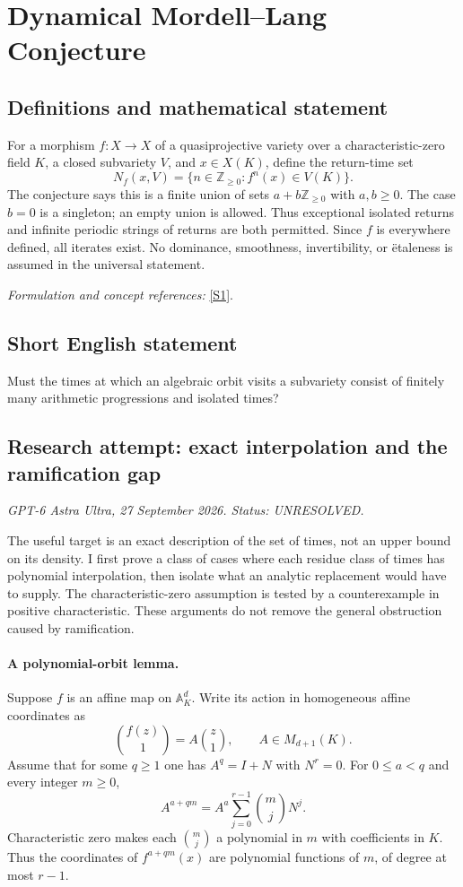 \documentclass[11pt]{article}
\begin{document}
\section*{\texorpdfstring{Dynamical Mordell–Lang Conjecture}{Dynamical Mordell–Lang Conjecture}}\label{30006813}
\subsection{Definitions and mathematical statement}
For a morphism $f:X\to X$ of a quasiprojective variety over a characteristic-zero field $K$, a closed subvariety $V$, and $x\in X(K)$, define the return-time set
\[
 N_f(x,V)=\{n\in{\mathbb{Z}}_{\ge0}:f^n(x)\in V(K)\}.
\]
The conjecture says this is a finite union of sets $a+b{\mathbb{Z}}_{\ge0}$ with $a,b\ge0$. The case $b=0$ is a singleton; an empty union is allowed. Thus exceptional isolated returns and infinite periodic strings of returns are both permitted. Since $f$ is everywhere defined, all iterates exist. No dominance, smoothness, invertibility, or \"etaleness is assumed in the universal statement.
\par\smallskip\textit{Formulation and concept references:} \href{https://arxiv.org/pdf/2602.08608v2}{[S1]}.

\subsection{Short English statement}
Must the times at which an algebraic orbit visits a subvariety consist of finitely many arithmetic progressions and isolated times?
\subsection{Research attempt: exact interpolation and the ramification gap}
\textit{GPT-6 Astra Ultra, 27 September 2026. Status: UNRESOLVED.}

The useful target is an exact description of the set of times, not an upper bound on its density. I first prove a class of cases where each residue class of times has polynomial interpolation, then isolate what an analytic replacement would have to supply. The characteristic-zero assumption is tested by a counterexample in positive characteristic. These arguments do not remove the general obstruction caused by ramification.

\paragraph{A polynomial-orbit lemma.}
Suppose $f$ is an affine map on $\mathbb A^d_K$. Write its action in homogeneous affine coordinates as
\[
 \binom{f(z)}1=A\binom z1,
 \qquad A\in M_{d+1}(K).
\]
Assume that for some $q\ge1$ one has $A^q=I+N$ with $N^r=0$. For $0\le a<q$ and every integer $m\ge0$,
\[
 A^{a+qm}=A^a\sum_{j=0}^{r-1}\binom mjN^j.                 \tag{1}
\]
Characteristic zero makes each $\binom mj$ a polynomial in $m$ with coefficients in $K$. Thus the coordinates of $f^{a+qm}(x)$ are polynomial functions of $m$, of degree at most $r-1$.
\end{document}
